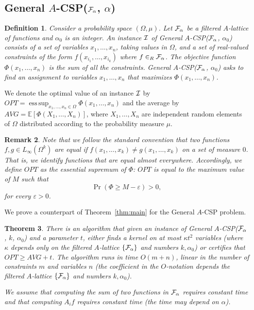 \documentclass[11pt]{article}
\DeclareMathOperator*{\esssup}{ess\,sup}
\newcommand {\set}   [1] {\left\{ #1 \right\}}
\newcommand {\brc}   [1] {\left(#1\right)}
\newcommand {\Exp}       {\mathbb{E}}
\newcommand {\Prob}  [1] {\Pr \brc{#1 }}
\newcommand {\E}     [1] {\Exp\left[#1\right]}
\newcommand {\calF}   {{\cal{F}}}
\newcommand {\calI}    {{\cal I}}
\newtheorem{theorem}{Theorem}
\newtheorem{definition}[theorem]{Definition}
\newtheorem{remark}[theorem]{Remark}
\begin{document}
\subsection{General $A$-CSP($\calF_{\alpha}$, $\alpha$)}
\begin{definition}
Consider a probability space $(\Omega, \mu)$. Let $\calF_{\alpha}$ be a filtered $A$-lattice of functions and $\alpha_0$ is an integer.
An instance $\calI$ of General $A$-CSP($\calF_{\alpha}$,  $\alpha_0$) consists of a set of variables $x_1,\dots, x_n$, taking values in $\Omega$,
and a set of real-valued constraints of the form $f(x_{i_1}, \dots, x_{i_k})$  where $f\in_R \calF_{\alpha}$. The objective function $\Phi(x_1,\dots, x_n)$ is the sum of
all the constraints.
General $A$-CSP($\calF_{\alpha}$, $\alpha_0$) asks to find an assignment to variables $x_1, \dots, x_n$ that maximizes
$\Phi(x_1,\dots, x_n)$.
\end{definition}
We denote the optimal value of an instance $\cal I$ by $OPT = \esssup_{x_1,\dots, x_n \in \Omega} \Phi(x_1,\dots, x_n)$ and the average
by $AVG = \E{\Phi(X_1,\dots, X_n)}$, where $X_1,\dots, X_n$ are independent random elements of $\Omega$ distributed according to the probability measure $\mu$.
\begin{remark}\label{rem:measure-0}
Note that we follow the standard convention that two functions $f,g \in L_{\infty}(\Omega^k)$ are equal if $f(x_1,\dots, x_k) \neq g(x_1,\dots,x_k)$ on a set of measure $0$.
That is, we identify functions that are equal almost everywhere. Accordingly, we define $OPT$ as the essential supremum  of $\Phi$:
 $OPT$ is equal to the maximum value of $M$ such that
$$\Prob{\Phi \geq M - \varepsilon} > 0,$$
for every $\varepsilon > 0$.
\end{remark}
We prove a counterpart of Theorem~\ref{thm:main} for the General $A$-CSP problem.

\begin{theorem}\label{thm:main-A-CSP}
There is an algorithm that given an instance of General $A$-CSP($\calF_{\alpha}$, $k$, $\alpha_0$) and a parameter $t$,
either finds a kernel on at most $\kappa t^2$ variables (where $\kappa$ depends only on the filtered $A$-lattice $\set{\calF_{\alpha}}$ and numbers $k, \alpha_0$)
or
certifies that $OPT \geq  AVG + t$.
The algorithm runs in time $O(m+n)$, linear in the number of constraints $m$ and variables $n$ (the coefficient in the $O$-notation depends the filtered $A$-lattice $\set{\calF_{\alpha}}$ and numbers $k, \alpha_0$).

 We assume that computing the sum of two functions in  $\calF_{\alpha}$ requires constant time and that computing $A_i f$ requires constant time
(the time may depend on $\alpha$).
\end{theorem}
\end{document}
